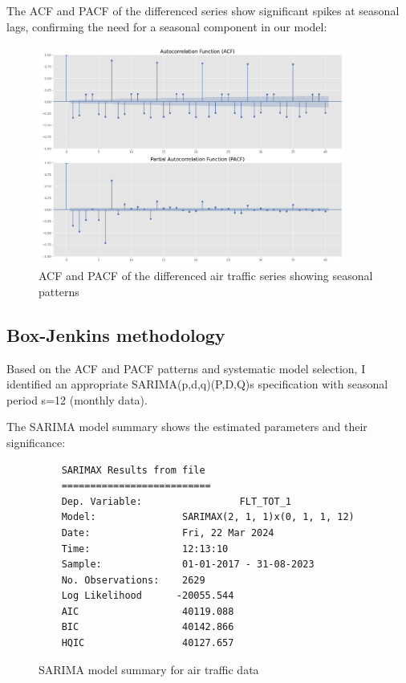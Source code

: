 \documentclass[11pt,a4paper]{article}
\begin{document}
The ACF and PACF of the differenced series show significant spikes at seasonal lags, confirming the need for a seasonal component in our model:

\begin{figure}[H]
    \centering
    \includegraphics[width=0.9\textwidth]{plots/sarima/airtraffic_acf_pacf.png}
    \caption{ACF and PACF of the differenced air traffic series showing seasonal patterns}
    \label{fig:airtraffic_acf_pacf}
\end{figure}

\subsection{Box-Jenkins methodology}

Based on the ACF and PACF patterns and systematic model selection, I identified an appropriate SARIMA(p,d,q)(P,D,Q)s specification with seasonal period s=12 (monthly data).

The SARIMA model summary shows the estimated parameters and their significance:

\begin{figure}[H]
    \centering
    \begin{verbatim}
    SARIMAX Results from file
    ==========================
    Dep. Variable:                 FLT_TOT_1
    Model:               SARIMAX(2, 1, 1)x(0, 1, 1, 12)
    Date:                Fri, 22 Mar 2024
    Time:                12:13:10
    Sample:              01-01-2017 - 31-08-2023
    No. Observations:    2629
    Log Likelihood      -20055.544
    AIC                  40119.088
    BIC                  40142.866
    HQIC                 40127.657
    \end{verbatim}
    \caption{SARIMA model summary for air traffic data}
    \label{fig:sarima_summary}
\end{figure}
\end{document}
